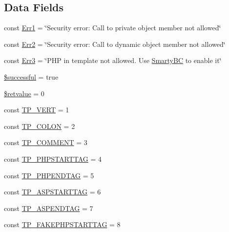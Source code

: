\subsection*{Data Fields}
\begin{DoxyCompactItemize}
\item 
const \hyperlink{class_smarty___internal___templateparser_ad48df3d38f610b1b40edb2cf28e503ca}{Err1} = \char`\"{}Security error\+: Call to private object member not allowed\char`\"{}
\item 
const \hyperlink{class_smarty___internal___templateparser_aebecc92c77dadf855c9a946efd82c8c0}{Err2} = \char`\"{}Security error\+: Call to dynamic object member not allowed\char`\"{}
\item 
const \hyperlink{class_smarty___internal___templateparser_a3553fc7ef4a922147894a638c20c5574}{Err3} = \char`\"{}P\+H\+P in template not allowed. Use \hyperlink{class_smarty_b_c}{Smarty\+B\+C} to enable it\char`\"{}
\item 
\hyperlink{class_smarty___internal___templateparser_abdc0098b3ead0fb819e232570620128d}{\$successful} = true
\item 
\hyperlink{class_smarty___internal___templateparser_ac7a3e22778442d5fd9455d1635b5c0b0}{\$retvalue} = 0
\item 
const \hyperlink{class_smarty___internal___templateparser_a5bbd11c12dd3bba3117d7f3ec73a06e7}{T\+P\+\_\+\+V\+E\+R\+T} = 1
\item 
const \hyperlink{class_smarty___internal___templateparser_aacc88fb1d2fb4eb3fed995ea82aee18f}{T\+P\+\_\+\+C\+O\+L\+O\+N} = 2
\item 
const \hyperlink{class_smarty___internal___templateparser_a80361d10658e3c9d2adc5fce505791c3}{T\+P\+\_\+\+C\+O\+M\+M\+E\+N\+T} = 3
\item 
const \hyperlink{class_smarty___internal___templateparser_ae84c82611d5a0332578c7e4875c16194}{T\+P\+\_\+\+P\+H\+P\+S\+T\+A\+R\+T\+T\+A\+G} = 4
\item 
const \hyperlink{class_smarty___internal___templateparser_a89b3b0fa56d9b4af348079eb10478757}{T\+P\+\_\+\+P\+H\+P\+E\+N\+D\+T\+A\+G} = 5
\item 
const \hyperlink{class_smarty___internal___templateparser_a00fedec5377fbb48afad5f55c3540189}{T\+P\+\_\+\+A\+S\+P\+S\+T\+A\+R\+T\+T\+A\+G} = 6
\item 
const \hyperlink{class_smarty___internal___templateparser_a1389f360373b727622bfa71d85aab34c}{T\+P\+\_\+\+A\+S\+P\+E\+N\+D\+T\+A\+G} = 7
\item 
const \hyperlink{class_smarty___internal___templateparser_a5a5f524ae559631e617b9d1437030655}{T\+P\+\_\+\+F\+A\+K\+E\+P\+H\+P\+S\+T\+A\+R\+T\+T\+A\+G} = 8

\end{DoxyCompactItemize}
